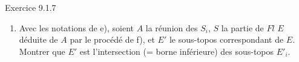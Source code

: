 \documentclass[10pt]{../fichiers-configuration-latex/smfart}
\begin{document}
\begin{enonce*}[remark]{Exercice 9.1.7}
\begin{enumerate}
\begin{enumerate}
\item $u$ est l'un des facteurs d'une flèche composée dont
l'autre facteur ainsi que le composé sont dans $A_n$.

\item $u$ est une somme d'une petite famille de flèches $\in
A_n$.

\item Il existe un épimorphisme $Y'\rightarrow Y$, tel que
$u':X'=\fprod{X}{Y'}{Y}\rightarrow Y'$ déduit de $u$ par changement
de base soit dans $A_n$.
\end{enumerate}

\item Avec les notations de e), soient $A$ la réunion des $S_i$, $S$
la partie de $Fl$ $E$ déduite de $A$ par le procédé de f), et $E'$
le sous-topos correspondant de $E$. Montrer que $E'$ est
l'intersection (= borne inférieure) des sous-topos $E'_i$.
\end{enumerate}
\end{enonce*}
\end{document}
